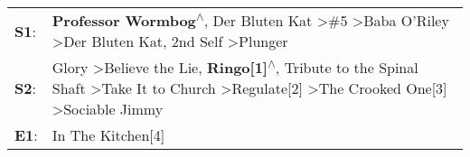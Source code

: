\begin{supertabular}{p{0.03\textwidth}p{0.92\textwidth}}
 \textbf{S1}:  &                                                                                   \textbf{Professor Wormbog\textsuperscript{$\wedge$}}, \enspace Der Bluten Kat\textsuperscript{} \textgreater \enspace \#5\textsuperscript{} \textgreater \enspace Baba O'Riley\textsuperscript{} \textgreater \enspace Der Bluten Kat\textsuperscript{}, \enspace 2nd Self\textsuperscript{} \textgreater \enspace Plunger\textsuperscript{}  \enspace  \\
 \textbf{S2}:  &  Glory\textsuperscript{} \textgreater \enspace Believe the Lie\textsuperscript{}, \enspace \textbf{Ringo[1]\textsuperscript{$\wedge$}}, \enspace Tribute to the Spinal Shaft\textsuperscript{} \textgreater \enspace Take It to Church\textsuperscript{} \textgreater \enspace Regulate[2]\textsuperscript{} \textgreater \enspace The Crooked One[3]\textsuperscript{} \textgreater \enspace Sociable Jimmy\textsuperscript{}  \enspace  \\
 \textbf{E1}:  &                                                                                                                                                                                                                                                                                                                                                                                            In The Kitchen[4]\textsuperscript{}  \enspace  \\
\end{supertabular}
